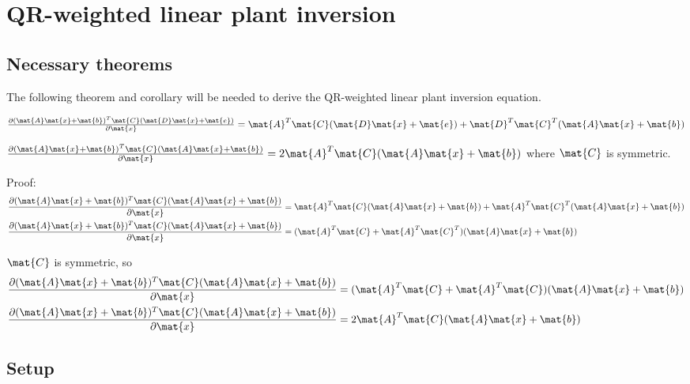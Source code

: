 
\chapter{QR-weighted linear plant inversion}

\section{Necessary theorems}

The following theorem and corollary will be needed to derive the QR-weighted
linear plant inversion equation.
\begin{theorem}
  $\frac{\partial (\mat{A}\mat{x} + \mat{b})^T\mat{C}
    (\mat{D}\mat{x} + \mat{e})}{\partial\mat{x}} =
    \mat{A}^T\mat{C}(\mat{D}\mat{x} + \mat{e}) + \mat{D}^T\mat{C}^T
    (\mat{A}\mat{x} + \mat{b})$
\end{theorem}
\begin{corollary}
  \label{cor:partial_ax_b}

  $\frac{\partial (\mat{A}\mat{x} + \mat{b})^T\mat{C}
    (\mat{A}\mat{x} + \mat{b})}{\partial\mat{x}} =
    2\mat{A}^T\mat{C}(\mat{A}\mat{x} + \mat{b})$ where $\mat{C}$ is symmetric.

  Proof:
  \begin{align*}
    \frac{\partial (\mat{A}\mat{x} + \mat{b})^T\mat{C}
      (\mat{A}\mat{x} + \mat{b})}{\partial\mat{x}} &=
      \mat{A}^T\mat{C}(\mat{A}\mat{x} + \mat{b}) + \mat{A}^T\mat{C}^T
      (\mat{A}\mat{x} + \mat{b}) \\
    \frac{\partial (\mat{A}\mat{x} + \mat{b})^T\mat{C}
      (\mat{A}\mat{x} + \mat{b})}{\partial\mat{x}} &=
      (\mat{A}^T\mat{C} + \mat{A}^T\mat{C}^T)(\mat{A}\mat{x} + \mat{b})
  \end{align*}

  $\mat{C}$ is symmetric, so
  \begin{align*}
    \frac{\partial (\mat{A}\mat{x} + \mat{b})^T\mat{C}
      (\mat{A}\mat{x} + \mat{b})}{\partial\mat{x}} &=
      (\mat{A}^T\mat{C} + \mat{A}^T\mat{C})(\mat{A}\mat{x} + \mat{b}) \\
    \frac{\partial (\mat{A}\mat{x} + \mat{b})^T\mat{C}
      (\mat{A}\mat{x} + \mat{b})}{\partial\mat{x}} &=
      2\mat{A}^T\mat{C}(\mat{A}\mat{x} + \mat{b})
  \end{align*}
\end{corollary}

\section{Setup}


